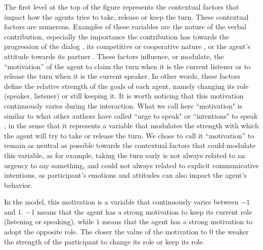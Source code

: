 The first level at the top of the figure represents the contextual factors that impact how the agents tries to take, release or keep the turn. These contextual factors are numerous. Examples of these variables are the nature of the verbal contribution, especially the importance the contribution has towards the progression of the dialog \citep{selfridge_bidding_2009}, its competitive or cooperative nature \citep{cafaro_effects_2016}, or the agent's attitude towards its partner \citep{ter_maat_how_2010}. 
These factors influence, or modulate, the ``motivation'' of the agent to claim the turn when it is the current listener or to release the turn when it is the current speaker. 
In other words, these factors define the relative strength of the goals of each agent, namely changing its role (speaker, listener) or still keeping it. It is worth noticing that this motivation continuously varies during the interaction. 
What we call here ``motivation" is similar to what other authors have called ``urge to speak" \citep{thorisson_multiparty_2010} or ``intentions"  to speak \citep{lessmann_towards_2004}, in the sense that it represents a variable that modulates the strength with which the agent will try to take or release the turn. We chose to call it ``motivation'' to remain as neutral as possible towards the contextual factors that could modulate this variable, as for example, taking the turn early is not always related to an urgency to say something, and could not always related to explicit communicative intentions, as participant's emotions and attitudes can also impact the agent's behavior. 

In the  model, this motivation is a variable that continuously varies between $-1$ and $1$. 
$-1$ means that the agent has a strong motivation to keep its current role (listening or speaking), while
$1$ means that the agent has a strong motivation to adopt the opposite role. 
The closer the value of the motivation to $0$ the weaker the strength of the participant to change its role or keep its role. 


